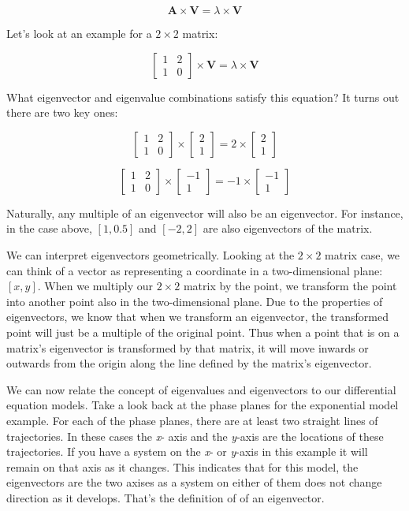 \documentclass[]{memoir}
\begin{document}
\[\mathbf{A} \times \mathbf{V} = \lambda \times \mathbf{V}\]

Let's look at an example for a $2\times2$ matrix:

\[\begin{bmatrix} 1 & 2 \\ 1 & 0 \end{bmatrix} \times \mathbf{V} = \lambda \times \mathbf{V}\]

What eigenvector and eigenvalue combinations satisfy this equation? It
turns out there are two key ones:

\[\begin{bmatrix} 1 & 2 \\ 1 & 0 \end{bmatrix} \times \begin{bmatrix} 2 \\ 1 \end{bmatrix}= 2 \times \begin{bmatrix} 2 \\ 1 \end{bmatrix}\]

\[\begin{bmatrix} 1 & 2 \\ 1 & 0 \end{bmatrix} \times \begin{bmatrix} -1 \\ 1 \end{bmatrix} = -1 \times \begin{bmatrix} -1 \\ 1 \end{bmatrix}\]

Naturally, any multiple of an eigenvector will also be an eigenvector.
For instance, in the case above, $[1, 0.5]$ and $[-2, 2]$ are also
eigenvectors of the matrix.

We can interpret eigenvectors geometrically. Looking at the $2\times2$
matrix case, we can think of a vector as representing a coordinate in a
two-dimensional plane: $[x,y]$. When we multiply our $2\times2$ matrix
by the point, we transform the point into another point also in the
two-dimensional plane. Due to the properties of eigenvectors, we know
that when we transform an eigenvector, the transformed point will just
be a multiple of the original point. Thus when a point that is on a
matrix's eigenvector is transformed by that matrix, it will move inwards
or outwards from the origin along the line defined by the matrix's
eigenvector.

We can now relate the concept of eigenvalues and eigenvectors to our
differential equation models. Take a look back at the phase planes for
the exponential model example. For each of the phase planes, there are
at least two straight lines of trajectories. In these cases the
\emph{x}- axis and the \emph{y}-axis are the locations of these
trajectories. If you have a system on the \emph{x}- or \emph{y}-axis in
this example it will remain on that axis as it changes. This indicates
that for this model, the eigenvectors are the two axises as a system on
either of them does not change direction as it develops. That's the
definition of of an eigenvector.
\end{document}
